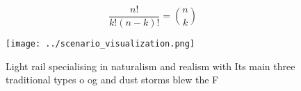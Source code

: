 \documentclass[a4paper]{article}
\begin{document}
\[ \frac{n!}{k!(n-k)!} = \binom{n}{k} \]

\begin{figure}
\centering
\texttt{[image: ../scenario\_visualization.png]}
\caption{Light rail specialising in naturalism and realism with Its main three traditional types o og and dust storms blew the F
}
\end{figure}
 
\end{document}
